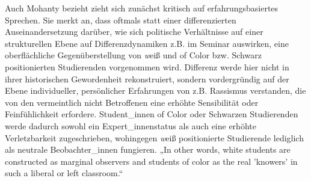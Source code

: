 Auch Mohanty bezieht zieht sich zunächst kritisch auf erfahrungsbasiertes
Sprechen. Sie merkt an, dass oftmals statt einer differenzierten
Auseinandersetzung darüber, wie sich politische Verhältnisse auf einer
strukturellen Ebene auf Differenzdynamiken z.B. im Seminar auswirken, eine
oberflächliche Gegenüberstellung von \textit{w}eiß und of Color bzw. Schwarz
positionierten Studierenden vorgenommen wird. Differenz werde hier nicht in
ihrer historischen Gewordenheit rekonstruiert, sondern vordergründig auf der
Ebene individueller, persönlicher Erfahrungen von z.B. Rassismus verstanden,
die von den vermeintlich nicht Betroffenen eine erhöhte Sensibilität oder
Feinfühlichkeit erfordere. Student\_innen of Color oder Schwarzen Studierenden
werde dadurch sowohl ein Expert\_innenstatus als auch eine erhöhte
Verletzbarkeit zugeschrieben, wohingegen \textit{w}eiß positionierte Studierende
lediglich als neutrale Beobachter\_innen fungieren. „In other words, white
students are constructed as marginal observers and students of color as the
real 'knowers' in such a liberal or left
classroom.“\footnotemark{}\\

